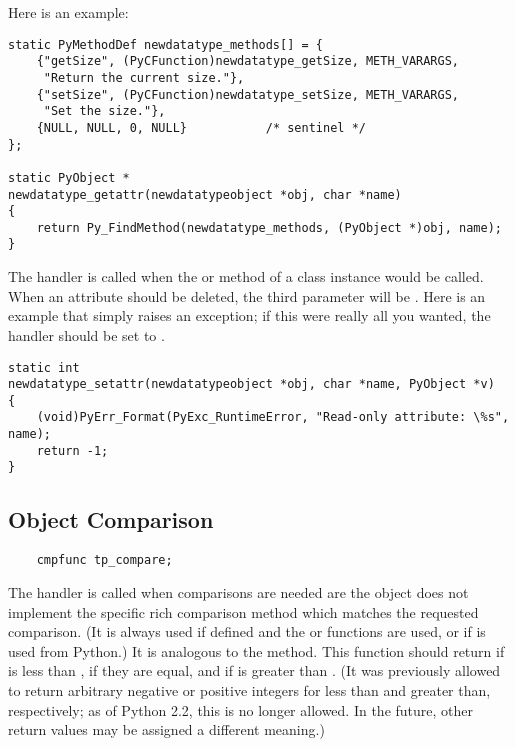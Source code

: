 Here is an example:

\begin{verbatim}
static PyMethodDef newdatatype_methods[] = {
    {"getSize", (PyCFunction)newdatatype_getSize, METH_VARARGS,
     "Return the current size."},
    {"setSize", (PyCFunction)newdatatype_setSize, METH_VARARGS,
     "Set the size."},
    {NULL, NULL, 0, NULL}           /* sentinel */
};

static PyObject *
newdatatype_getattr(newdatatypeobject *obj, char *name)
{
    return Py_FindMethod(newdatatype_methods, (PyObject *)obj, name);
}
\end{verbatim}

The  handler is called when the
 or  method of a class
instance would be called.  When an attribute should be deleted, the
third parameter will be \NULL.  Here is an example that simply raises
an exception; if this were really all you wanted, the
 handler should be set to \NULL.
   
\begin{verbatim}
static int
newdatatype_setattr(newdatatypeobject *obj, char *name, PyObject *v)
{
    (void)PyErr_Format(PyExc_RuntimeError, "Read-only attribute: \%s", name);
    return -1;
}
\end{verbatim}


\subsection{Object Comparison}

\begin{verbatim}
    cmpfunc tp_compare;
\end{verbatim}

The  handler is called when comparisons are needed
are the object does not implement the specific rich comparison method
which matches the requested comparison.  (It is always used if defined
and the  or 
functions are used, or if  is used from Python.)
It is analogous to the  method.  This function
should return  if  is less than
,  if they are equal, and  if
 is greater than
.
(It was previously allowed to return arbitrary negative or positive
integers for less than and greater than, respectively; as of Python
2.2, this is no longer allowed.  In the future, other return values
may be assigned a different meaning.)

